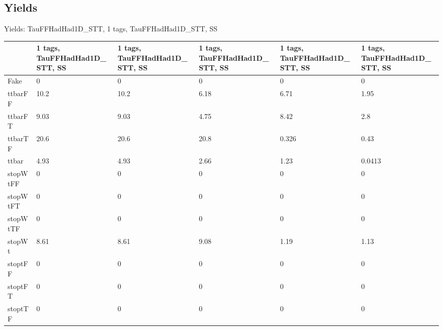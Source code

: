 
\subsection{Yields}

\begin{frame}{Yields: TauFFHadHad1D\_STT, 1 tags, TauFFHadHad1D\_STT, SS}
\begin{center}
  \begin{tabular}{l| >{\centering\let\newline\\\arraybackslash\hspace{0pt}}m{1.4cm}| >{\centering\let\newline\\\arraybackslash\hspace{0pt}}m{1.4cm}| >{\centering\let\newline\\\arraybackslash\hspace{0pt}}m{1.4cm}| >{\centering\let\newline\\\arraybackslash\hspace{0pt}}m{1.4cm}| >{\centering\let\newline\\\arraybackslash\hspace{0pt}}m{1.4cm}}
    & 1 tags, TauFFHadHad1D\_STT, SS & 1 tags, TauFFHadHad1D\_STT, SS & 1 tags, TauFFHadHad1D\_STT, SS & 1 tags, TauFFHadHad1D\_STT, SS & 1 tags, TauFFHadHad1D\_STT, SS \\
 \hline \hline
    Fake& 0 & 0 & 0 & 0 & 0 \\
 \hline
    ttbarFF& 10.2 & 10.2 & 6.18 & 6.71 & 1.95 \\
 \hline
    ttbarFT& 9.03 & 9.03 & 4.75 & 8.42 & 2.8 \\
 \hline
    ttbarTF& 20.6 & 20.6 & 20.8 & 0.326 & 0.43 \\
 \hline
    ttbar& 4.93 & 4.93 & 2.66 & 1.23 & 0.0413 \\
 \hline
    stopWtFF& 0 & 0 & 0 & 0 & 0 \\
 \hline
    stopWtFT& 0 & 0 & 0 & 0 & 0 \\
 \hline
    stopWtTF& 0 & 0 & 0 & 0 & 0 \\
 \hline
    stopWt& 8.61 & 8.61 & 9.08 & 1.19 & 1.13 \\
 \hline
    stoptFF& 0 & 0 & 0 & 0 & 0 \\
 \hline
    stoptFT& 0 & 0 & 0 & 0 & 0 \\
 \hline
    stoptTF& 0 & 0 & 0 & 0 & 0 \\

\end{tabular}
\end{center}
\end{frame}
